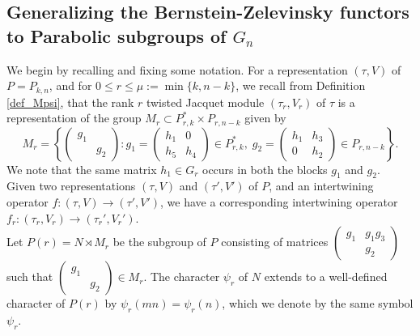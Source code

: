 \documentclass[reqno]{amsart}
\theoremstyle{definition}
\theoremstyle{remark}
\numberwithin{equation}{section}
\newcommand{\bbsm}{\left (\begin{smallmatrix}}      \newcommand{\besm}{\end{smallmatrix}\right )}
\begin{document}
\subsection{Generalizing the Bernstein-Zelevinsky functors to Parabolic subgroups of $G_n$}
\label{sec_equivalence} %
We begin by recalling and fixing some notation. For a representation $(\tau,V)$ of $P = P_{k,n}$, and for $0 \leq r \leq \mu:=\min\{k,n-k\}$, we recall from Definition \ref{def_Mpsi}, that the rank $r$ twisted Jacquet module $(\tau_r,V_r)$ of $\tau$ is a representation of the group $M_r \subset P^*_{r,k} \times P_{r,n-k}$ given by 
\[
    M_r=\left\{\bbsm g_1 &  \\
 &g_2 \besm \colon 
    g_1=\bbsm h_1 &  0\\h_5 & h_4 \besm \in P^*_{r,k}, \;  g_2=\bbsm h_1& h_3\\0&h_2 \besm \in P_{r,n-k} \right\}. \]
We note that the same  matrix  $h_1 \in G_r$ occurs in both the blocks $g_1$ and $g_2$.\\

Given two representations $(\tau, V)$ and $(\tau',V')$ of $P$, and an intertwining operator $f:(\tau,V) \to (\tau',V')$, we have a corresponding intertwining operator $f_r:(\tau_r,V_r) \to (\tau_r', V_r')$.\\

Let $P(r)=N \rtimes M_r$ be the subgroup of $P$ consisting of matrices $\bbsm g_1 & g_1g_3\\ & g_2 \besm$ such that $\bbsm g_1 & \\ & g_2 \besm \in M_r$. The character $\psi_r$ of $N$ extends to a well-defined character of $P(r)$ by $\psi_r(mn)= \psi_r(n)$, which we denote by the same symbol $\psi_r$.\\
\end{document}
